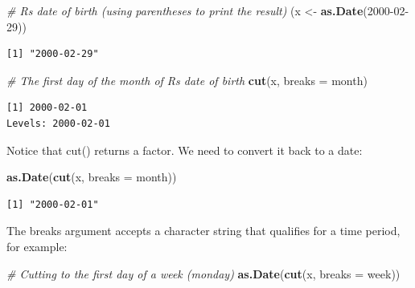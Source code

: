 \documentclass[
]{book}
\newenvironment{Shaded}{\begin{snugshade}}{\end{snugshade}}
\newcommand{\AttributeTok}[1]{\textcolor[rgb]{0.13,0.29,0.53}{#1}}
\newcommand{\CommentTok}[1]{\textcolor[rgb]{0.56,0.35,0.01}{\textit{#1}}}
\newcommand{\FunctionTok}[1]{\textcolor[rgb]{0.13,0.29,0.53}{\textbf{#1}}}
\newcommand{\NormalTok}[1]{#1}
\newcommand{\OtherTok}[1]{\textcolor[rgb]{0.56,0.35,0.01}{#1}}
\newcommand{\StringTok}[1]{\textcolor[rgb]{0.31,0.60,0.02}{#1}}
\begin{document}
\begin{Shaded}
\begin{Highlighting}[]
\CommentTok{\# R\textquotesingle{}s date of birth (using parentheses to print the result)}
\NormalTok{(x }\OtherTok{\textless{}{-}} \FunctionTok{as.Date}\NormalTok{(}\StringTok{\textquotesingle{}2000{-}02{-}29\textquotesingle{}}\NormalTok{))}
\end{Highlighting}
\end{Shaded}

\begin{verbatim}
[1] "2000-02-29"
\end{verbatim}

\begin{Shaded}
\begin{Highlighting}[]
\CommentTok{\# The first day of the month of R\textquotesingle{}s date of birth}
\FunctionTok{cut}\NormalTok{(x, }\AttributeTok{breaks =} \StringTok{\textquotesingle{}month\textquotesingle{}}\NormalTok{)}
\end{Highlighting}
\end{Shaded}

\begin{verbatim}
[1] 2000-02-01
Levels: 2000-02-01
\end{verbatim}

Notice that cut() returns a factor. We need to convert it back to a date:

\begin{Shaded}
\begin{Highlighting}[]
\FunctionTok{as.Date}\NormalTok{(}\FunctionTok{cut}\NormalTok{(x, }\AttributeTok{breaks =} \StringTok{\textquotesingle{}month\textquotesingle{}}\NormalTok{))}
\end{Highlighting}
\end{Shaded}

\begin{verbatim}
[1] "2000-02-01"
\end{verbatim}

The breaks argument accepts a character string that qualifies for a time period, for example:

\begin{Shaded}
\begin{Highlighting}[]
\CommentTok{\# Cutting to the first day of a week (monday)}
\FunctionTok{as.Date}\NormalTok{(}\FunctionTok{cut}\NormalTok{(x, }\AttributeTok{breaks =} \StringTok{\textquotesingle{}week\textquotesingle{}}\NormalTok{))}
\end{Highlighting}
\end{Shaded}
\end{document}
